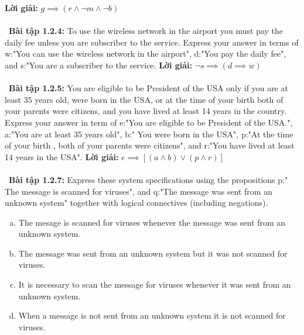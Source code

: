 \documentclass[a4paper]{article}
\begin{document}
\textbf{Lời giải: } $g \implies (r \land \lnot m \land \lnot b)$
 \\\ \\\
\textbf{Bài tập 1.2.4:} To use the wireless network in the airport you must pay the daily fee unless you are subscriber to the service. Express your answer in terms of w:"You can use the wireless network in the airport", d:"You pay the daily fee", and s:"You are a subscriber to the service. 
\textbf{Lời giải: }  $\lnot s \implies (d \implies w)$
 \\\ \\\
\textbf{Bài tập 1.2.5:} You are eligible  to be President of the USA only if you are at least 35 years old, were born in the USA, or at the time of your birth both of your parents were citizens, and you have lived at least 14 years in the country. Express your answer in term of e:"You are eligible to be President of the USA.", a:"You are at least 35 years old", b:" You were born in the USA", p:"At the time of your birth , both of your parents were citizens", and r:"You have lived at least 14 years in the USA".
\textbf{Lời giải: } $e \implies [(a \land b) \lor (p \land r)]$ \\\ \\\
\textbf{Bài tập 1.2.7:} Express these system specifications using the propositions p:" The message is scanned for viruses", and q:"The message was sent from an unknown system" together with logical connectives (including negations).
\begin{enumerate}[a)]
\item The mesage is scanned for viruses whenever the message was  sent from an unknown system.
\item The message was  sent from an unknown system but it was not scanned for viruses.
\item It is necessary to scan the message for viruses whenever it was sent from an unknown system.
\item When a message is not sent from an unknown system it is not scanned for viruses.
\end{enumerate}
 
\end{document}
